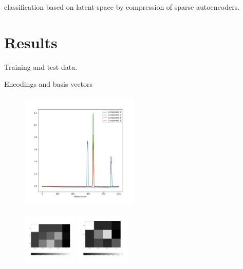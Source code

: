 \documentclass{article}
\begin{document}
classification based on latent-space by compression of sparse autoencoders.

\section{Results}
\label{sec:results}

Training and test data. 

Encodings and basis vectors

\begin{figure}
  \includegraphics[width=0.5\textwidth]{figures/raman_sim_3_encode_layer_1_finetune_13.png}
\end{figure}


\begin{figure}
  \includegraphics[width=0.23\textwidth]{figures/raman_sim_3_encode_layer_2_finetune_13.png}
  \includegraphics[width=0.23\textwidth]{figures/raman_sim_3_encode_layer_3_finetune_13.png}
\end{figure}
\end{document}
